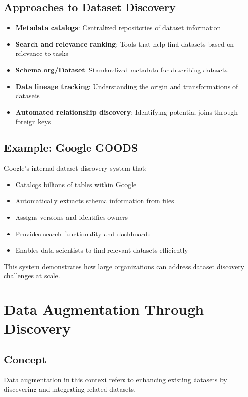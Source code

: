 \documentclass[12pt]{article}
\begin{document}
\subsection{Approaches to Dataset Discovery}
\begin{itemize}
    \item \textbf{Metadata catalogs}: Centralized repositories of dataset information
    \item \textbf{Search and relevance ranking}: Tools that help find datasets based on relevance to tasks
    \item \textbf{Schema.org/Dataset}: Standardized metadata for describing datasets
    \item \textbf{Data lineage tracking}: Understanding the origin and transformations of datasets
    \item \textbf{Automated relationship discovery}: Identifying potential joins through foreign keys
\end{itemize}

\subsection{Example: Google GOODS}
\begin{tcolorbox}[colback=blue!5!white,colframe=blue!75!black,title=Google GOODS (Google Dataset Search)]
Google's internal dataset discovery system that:
\begin{itemize}
    \item Catalogs billions of tables within Google
    \item Automatically extracts schema information from files
    \item Assigns versions and identifies owners
    \item Provides search functionality and dashboards
    \item Enables data scientists to find relevant datasets efficiently
\end{itemize}
This system demonstrates how large organizations can address dataset discovery challenges at scale.
\end{tcolorbox}

\section{Data Augmentation Through Discovery}

\subsection{Concept}
Data augmentation in this context refers to enhancing existing datasets by discovering and integrating related datasets.
\end{document}
